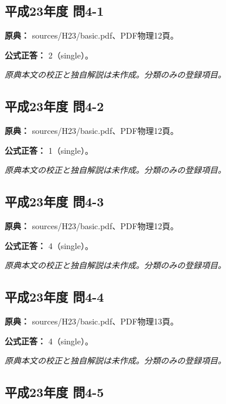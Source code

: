 \subsection{平成23年度 問4-1}
\label{q:h23-reg-basic-4-1}

\noindent\textbf{原典：} sources/H23/basic.pdf、PDF物理12頁。

\textbf{公式正答：} 2（single）。

\par\textit{原典本文の校正と独自解説は未作成。分類のみの登録項目。}

\subsection{平成23年度 問4-2}
\label{q:h23-reg-basic-4-2}

\noindent\textbf{原典：} sources/H23/basic.pdf、PDF物理12頁。

\textbf{公式正答：} 1（single）。

\par\textit{原典本文の校正と独自解説は未作成。分類のみの登録項目。}

\subsection{平成23年度 問4-3}
\label{q:h23-reg-basic-4-3}

\noindent\textbf{原典：} sources/H23/basic.pdf、PDF物理12頁。

\textbf{公式正答：} 4（single）。

\par\textit{原典本文の校正と独自解説は未作成。分類のみの登録項目。}

\subsection{平成23年度 問4-4}
\label{q:h23-reg-basic-4-4}

\noindent\textbf{原典：} sources/H23/basic.pdf、PDF物理13頁。

\textbf{公式正答：} 4（single）。

\par\textit{原典本文の校正と独自解説は未作成。分類のみの登録項目。}

\subsection{平成23年度 問4-5}
\label{q:h23-reg-basic-4-5}

